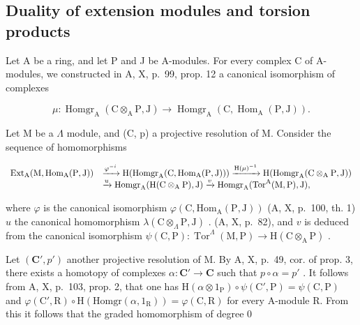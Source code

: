 \subsection{Duality of extension modules and torsion products}

Let A be a ring, and let P and J be A-modules. For every complex C of A-modules, we constructed in A, X, p.~99, prop. 12 a canonical isomorphism of complexes

\[
\mu : \operatorname{Homgr} _ {\mathrm{A}} (\mathrm{C} \otimes_ {\mathrm{A}} \mathrm{P}, \mathrm{J}) \longrightarrow \operatorname{Homgr} _ {\mathrm{A}} (\mathrm{C}, \operatorname{Hom} _ {\mathrm{A}} (\mathrm{P}, \mathrm{J})) .
\]

Let M be a \(\Lambda\) module, and (C, p) a projective resolution of M. Consider the sequence of homomorphisms

\[
\begin{array}{r l} \operatorname{Ext} _ {\mathrm{A}} (\mathrm{M}, \operatorname{Hom} _ {\mathrm{A}} (\mathrm{P}, \mathrm{J})) & \xrightarrow {\varphi^ {- i}} \mathrm{H} (\operatorname{Homgr} _ {\mathrm{A}} (\mathrm{C}, \operatorname{Hom} _ {\mathrm{A}} (\mathrm{P}, \mathrm{J}))) \xrightarrow {\mathrm{H} (\mu) ^ {- 1}} \mathrm{H} (\operatorname{Homgr} _ {\mathrm{A}} (\mathrm{C} \otimes_ {\mathrm{A}} \mathrm{P}, \mathrm{J})) \\ & \xrightarrow {u} \operatorname{Homgr} _ {\mathrm{A}} (\mathrm{H} (\mathrm{C} \otimes_ {\mathrm{A}} \mathrm{P}), \mathrm{J}) \xrightarrow {v} \operatorname{Homgr} _ {\mathrm{A}} (\operatorname{Tor} ^ {\mathrm{A}} (\mathrm{M}, \mathrm{P}), \mathrm{J}), \end{array}
\]

where \(\varphi\) is the canonical isomorphism \(\varphi(\mathrm{C},\mathrm{Hom}_{\mathrm{A}}(\mathrm{P},\mathrm{J}))\) (A, X, p.~100, th. 1) \(u\) the canonical homomorphism \(\lambda(\mathrm{C}\otimes_{\Lambda}\mathrm{P},\mathrm{J})\) . (A, X, p.~82), and \(v\) is deduced from the canonical isomorphism \(\psi(\mathrm{C},\mathrm{P}):\operatorname{Tor}^{\Lambda}(\mathrm{M},\mathrm{P})\longrightarrow\mathrm{H}(\mathrm{C}\otimes_{\mathrm{A}}\mathrm{P})\) .

Let \((\mathbf{C}', p')\) another projective resolution of M. By A, X, p.~49, cor. of prop. 3, there exists a homotopy of complexes \(\alpha: \mathbf{C}' \to \mathbf{C}\) such that \(p \circ \alpha = p'\) . It follows from A, X, p.~103, prop. 2, that one has \(\mathrm{H}(\alpha \otimes 1_{\mathrm{P}}) \circ \psi(\mathrm{C}', \mathrm{P}) = \psi(\mathrm{C}, \mathrm{P})\) and \(\varphi(\mathrm{C}', \mathrm{R}) \circ \mathrm{H}(\mathrm{Homgr}(\alpha, 1_{\mathrm{R}})) = \varphi(\mathrm{C}, \mathrm{R})\) for every A-module R. From this it follows that the graded homomorphism of degree 0

